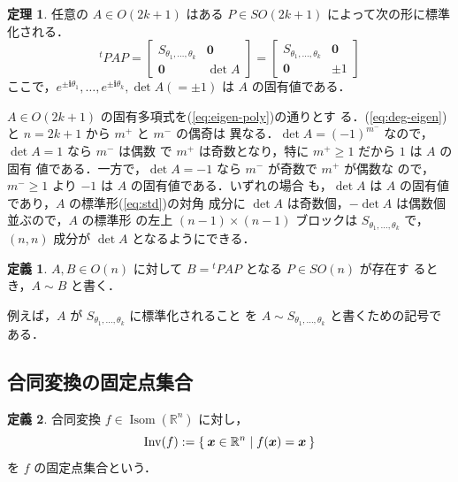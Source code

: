 \documentclass[11pt, uplatex, dvipdfmx, titlepage]{jsarticle}
\makeatletter
\renewcommand{\i}{\mathbf{i}}
\DeclareMathOperator{\Isom}{Isom}
\DeclareMathOperator{\Inv}{Inv}
\renewenvironment{proof}[1][\proofname]{\par
  \pushQED{\qed}%
  \normalfont \topsep6\p@\@plus6\p@\relax
  \trivlist
  \item[\hskip\labelsep
         \bfseries
    {#1}]\ignorespaces
}{%
  \popQED\endtrivlist\@endpefalse
}
\theoremstyle{definition}
\newtheorem{theorem}{定理}[section]
\newtheorem*{definition}{定義}
\renewcommand{\proofname}{\textbf{証明}}
\makeatother
\begin{document}
\begin{theorem}
  任意の $A \in O(2k+1)$ はある $P \in SO(2k+1)$ によって次の形に標準化される．
  \[
    {}^{t}PAP = \left[
      \begin{array}{cc}
        S_{\theta_1, \ldots, \theta_k} & \bm{0}\\
        \bm{0} & \det A
      \end{array}
    \right] = \left[
      \begin{array}{cr}
        S_{\theta_1, \ldots, \theta_k} & \bm{0}\\
        \bm{0} & \pm 1
      \end{array}
    \right]
  \]
  ここで，$e^{\pm \i \theta_1}, \ldots, e^{\pm \i \theta_k}, \det A (=\pm 1)$ は $A$ の固有値である．
\end{theorem}

\begin{proof}
  $A \in O(2k+1)$ の固有多項式を(\ref{eq:eigen-poly})の通りとす
  る．(\ref{eq:deg-eigen}) と $n=2k+1$ から $m^{+}$ と $m^{-}$ の偶奇は
  異なる．$\det A=(-1)^{m^-}$ なので，$\det A=1$ なら $m^{-}$ は偶数
  で $m^{+}$ は奇数となり，特に $m^{+} \geq 1$ だから $1$ は $A$ の固有
  値である．一方で，$\det A=-1$ なら $m^{-}$ が奇数で $m^{+}$ が偶数な
  ので，$m^{-} \geq 1$ より $-1$ は $A$ の固有値である．いずれの場合
  も，$\det A$ は $A$ の固有値であり，$A$ の標準形(\ref{eq:std})の対角
  成分に $\det A$ は奇数個，$-\det A$ は偶数個並ぶので，$A$ の標準形
  の左上 $(n-1) \times (n-1)$ ブロックは $S_{\theta_1, \ldots,
    \theta_k}$ で，$(n,n)$ 成分が $\det A$ となるようにできる．
\end{proof}

\begin{definition}
  $A, B \in O(n)$ に対して $B={}^{t}PAP$ となる $P \in SO(n)$ が存在す
  るとき，$A \sim B$ と書く．
\end{definition}

例えば，$A$ が $S_{\theta_1, \ldots, \theta_k}$ に標準化されること
を $A \sim S_{\theta_1, \ldots, \theta_k}$ と書くための記号である．

\subsection{合同変換の固定点集合}\label{sec:invariants}

\begin{definition}
  合同変換 $f \in \Isom(\mathbb{R}^n)$ に対し，
  \[
    \Inv(f) := \Set{\bm{x} \in \mathbb{R}^n | f(\bm{x}) = \bm{x}}
  \]
  を $f$ の固定点集合という．  
\end{definition}
\end{document}
